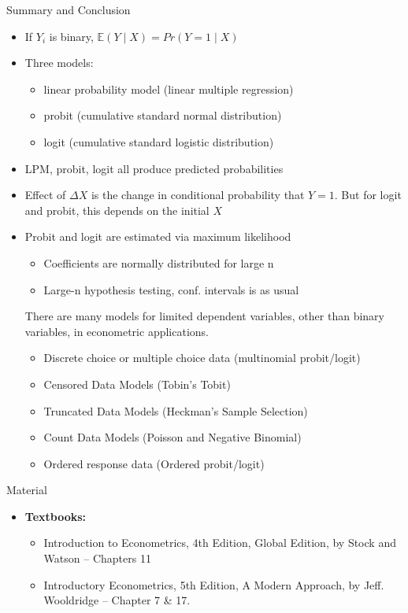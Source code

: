 \documentclass[notes,10pt, aspectratio=169]{beamer}
\begin{document}
\begin{frame}{Summary and Conclusion}
  \begin{itemize}
    \item If $Y_i$ is binary, $\mathbb{E}(Y\mid X)=Pr(Y=1\mid X)$
    \item Three models: 
    \begin{itemize}
        \item linear probability model (linear multiple regression)
        \item probit (cumulative standard normal distribution)
        \item logit (cumulative standard logistic distribution)
    \end{itemize}
    \item LPM, probit, logit all produce predicted probabilities
    \item Effect of $\Delta X$ is the change in conditional probability that $Y=1$. But for logit and probit, this depends on the initial $X$
    \item Probit and logit are estimated via maximum likelihood
  \begin{itemize}
    \item Coefficients are normally distributed for large n
    \item Large-n hypothesis testing, conf. intervals is as usual
  \end{itemize}
  There are many models for limited dependent variables, other than binary variables,  in econometric applications.
  \begin{itemize}
    \item Discrete choice or multiple choice data (multinomial probit/logit)
    \item Censored Data Models (Tobin's Tobit)
    \item Truncated Data Models (Heckman's Sample Selection)
    \item Count Data Models (Poisson and Negative Binomial)
    \item Ordered response data (Ordered probit/logit)
  \end{itemize}

  \end{itemize}
\end{frame}



\begin{frame}[allowframebreaks]{Material}
\begin{itemize}
    \item[--] \textbf{Textbooks:}
    \begin{itemize}
        \item Introduction to Econometrics, 4th Edition, Global Edition, by Stock and Watson -- Chapters 11
        \item Introductory Econometrics, 5th Edition, A Modern Approach, by Jeff. Wooldridge -- Chapter 7 \& 17.
    \end{itemize}
\end{itemize}
\scriptsize{

 
}
\end{frame}
\end{document}
